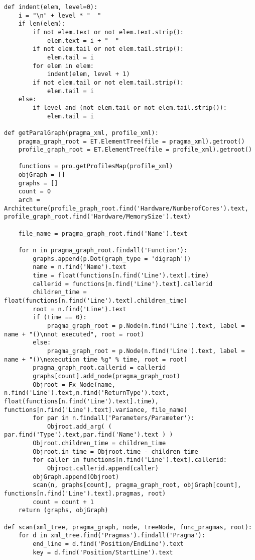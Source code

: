 \documentclass[a4paper,10pt,twoside]{book}
\begin{document}
\begin{lstlisting}[language=CCC, caption=pargraph.py]
def indent(elem, level=0):
    i = "\n" + level * "  "
    if len(elem):
        if not elem.text or not elem.text.strip():
            elem.text = i + "  "
        if not elem.tail or not elem.tail.strip():
            elem.tail = i
        for elem in elem:
            indent(elem, level + 1)
        if not elem.tail or not elem.tail.strip():
            elem.tail = i
    else:
        if level and (not elem.tail or not elem.tail.strip()):
            elem.tail = i

def getParalGraph(pragma_xml, profile_xml):
	pragma_graph_root = ET.ElementTree(file = pragma_xml).getroot()
	profile_graph_root = ET.ElementTree(file = profile_xml).getroot()

	functions = pro.getProfilesMap(profile_xml)
	objGraph = []
	graphs = []
	count = 0
	arch = Architecture(profile_graph_root.find('Hardware/NumberofCores').text, profile_graph_root.find('Hardware/MemorySize').text)

	file_name = pragma_graph_root.find('Name').text

	for n in pragma_graph_root.findall('Function'):
		graphs.append(p.Dot(graph_type = 'digraph'))
		name = n.find('Name').text
		time = float(functions[n.find('Line').text].time)
		callerid = functions[n.find('Line').text].callerid
		children_time = float(functions[n.find('Line').text].children_time)
		root = n.find('Line').text
		if (time == 0):
			pragma_graph_root = p.Node(n.find('Line').text, label = name + "()\nnot executed", root = root)
		else:
			pragma_graph_root = p.Node(n.find('Line').text, label = name + "()\nexecution time %g" % time, root = root)
		pragma_graph_root.callerid = callerid
		graphs[count].add_node(pragma_graph_root)
		Objroot = Fx_Node(name, n.find('Line').text,n.find('ReturnType').text, float(functions[n.find('Line').text].time), functions[n.find('Line').text].variance, file_name)
		for par in n.findall('Parameters/Parameter'):
			Objroot.add_arg( ( par.find('Type').text,par.find('Name').text ) )
		Objroot.children_time = children_time
		Objroot.in_time = Objroot.time - children_time
		for caller in functions[n.find('Line').text].callerid:
			Objroot.callerid.append(caller)
		objGraph.append(Objroot)
		scan(n, graphs[count], pragma_graph_root, objGraph[count], functions[n.find('Line').text].pragmas, root)
		count = count + 1
	return (graphs, objGraph)

def scan(xml_tree, pragma_graph, node, treeNode, func_pragmas, root):
	for d in xml_tree.find('Pragmas').findall('Pragma'):
		end_line = d.find('Position/EndLine').text
		key = d.find('Position/StartLine').text


\end{lstlisting}
\end{document}
